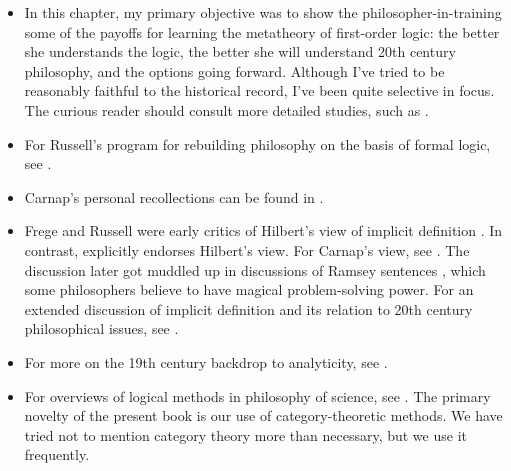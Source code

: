\begin{itemize}
\item In this chapter, my primary objective was to show the
  philosopher-in-training some of the payoffs for learning the
  metatheory of first-order logic: the better she understands the
  logic, the better she will understand 20th century philosophy, and
  the options going forward.  Although I've tried to be reasonably
  faithful to the historical record, I've been quite selective in
  focus.  The curious reader should consult more detailed studies,
  such as \cite{coffa,friedman1999,hylton,soames}.
\item For Russell's program for rebuilding philosophy on the basis of
  formal logic, see \citep{russell-math,russell-le}.
\item Carnap's personal recollections can be found in
  \citep{carnap-schilpp}.
\item Frege and Russell were early critics of Hilbert's view of
  implicit definition \cite[see e.g.][]{frege-hilbert}.  In contrast,
  \cite[I.7]{schlick} explicitly endorses Hilbert's view.  For
  Carnap's view, see \cite{park2012}.  The discussion later got
  muddled up in discussions of Ramsey sentences \cite[see
  e.g.][]{winnie-id,lewis-terms}, which some philosophers believe to
  have magical problem-solving power.  For an extended discussion of
  implicit definition and its relation to 20th century philosophical
  issues, see \cite{benmen}.
\item For more on the 19th century backdrop to analyticity, see
  \cite{coffa-geom}.
\item For overviews of logical methods in philosophy of science, see
  \cite{benthem-new,winnie,fraassen-new,leitgeb}.  The primary novelty
  of the present book is our use of category-theoretic methods.  We
  have tried not to mention category theory more than necessary, but
  we use it frequently.
\end{itemize}



